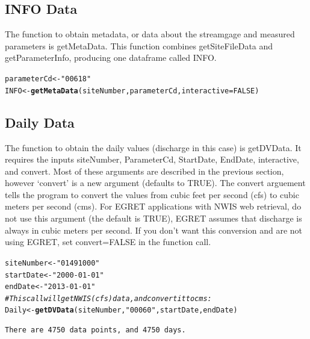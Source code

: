 \documentclass[a4paper,11pt]{article}\usepackage[]{graphicx}\usepackage[]{color}
\makeatletter
\newcommand{\hlnum}[1]{\textcolor[rgb]{0.686,0.059,0.569}{#1}}%
\newcommand{\hlstr}[1]{\textcolor[rgb]{0.192,0.494,0.8}{#1}}%
\newcommand{\hlcom}[1]{\textcolor[rgb]{0.678,0.584,0.686}{\textit{#1}}}%
\newcommand{\hlstd}[1]{\textcolor[rgb]{0.345,0.345,0.345}{#1}}%
\newcommand{\hlkwb}[1]{\textcolor[rgb]{0.69,0.353,0.396}{#1}}%
\newcommand{\hlkwc}[1]{\textcolor[rgb]{0.333,0.667,0.333}{#1}}%
\newcommand{\hlkwd}[1]{\textcolor[rgb]{0.737,0.353,0.396}{\textbf{#1}}}%
\newenvironment{kframe}{%
 \def\at@end@of@kframe{}%
 \ifinner\ifhmode%
  \def\at@end@of@kframe{\end{minipage}}%
  \begin{minipage}{\columnwidth}%
 \fi\fi%
 \def\FrameCommand##1{\hskip\@totalleftmargin \hskip-\fboxsep
 \colorbox{shadecolor}{##1}\hskip-\fboxsep
     \hskip-\linewidth \hskip-\@totalleftmargin \hskip\columnwidth}%
 \MakeFramed {\advance\hsize-\width
   \@totalleftmargin\z@ \linewidth\hsize
   \@setminipage}}%
 {\par\unskip\endMakeFramed%
 \at@end@of@kframe}
\newenvironment{knitrout}{}{} %
\makeatother
\begin{document}
\subsection{INFO Data}
\label{INFOsubsection}
The function to obtain metadata, or data about the streamgage and measured parameters is getMetaData. This function combines getSiteFileData and getParameterInfo, producing one dataframe called INFO.

\begin{knitrout}
\color{fgcolor}\begin{kframe}
\begin{alltt}
\hlstd{parameterCd} \hlkwb{<-} \hlstr{"00618"}
\hlstd{INFO} \hlkwb{<-}\hlkwd{getMetaData}\hlstd{(siteNumber,parameterCd,} \hlkwc{interactive}\hlstd{=}\hlnum{FALSE}\hlstd{)}
\end{alltt}
\end{kframe}
\end{knitrout}



\FloatBarrier

\subsection{Daily Data}
\label{Dailysubsection}
The function to obtain the daily values (discharge in this case) is getDVData.  It requires the inputs siteNumber, ParameterCd, StartDate, EndDate, interactive, and convert. Most of these arguments are described in the previous section, however `convert' is a new argument (defaults to TRUE). The convert arguement tells the program to convert the values from cubic feet per second (cfs) to cubic meters per second (cms). For EGRET applications with NWIS web retrieval, do not use this argument (the default is TRUE), EGRET assumes that discharge is always in cubic meters per second. If you don't want this conversion and are not using EGRET, set convert=FALSE in the function call. 

\begin{knitrout}
\color{fgcolor}\begin{kframe}
\begin{alltt}
\hlstd{siteNumber} \hlkwb{<-} \hlstr{"01491000"}
\hlstd{startDate} \hlkwb{<-} \hlstr{"2000-01-01"}
\hlstd{endDate} \hlkwb{<-} \hlstr{"2013-01-01"}
\hlcom{# This call will get NWIS (cfs) data , and convert it to cms:}
\hlstd{Daily} \hlkwb{<-} \hlkwd{getDVData}\hlstd{(siteNumber,} \hlstr{"00060"}\hlstd{, startDate, endDate)}
\end{alltt}
\begin{verbatim}
There are 4750 data points, and 4750 days.
\end{verbatim}
\end{kframe}
\end{knitrout}
\end{document}
